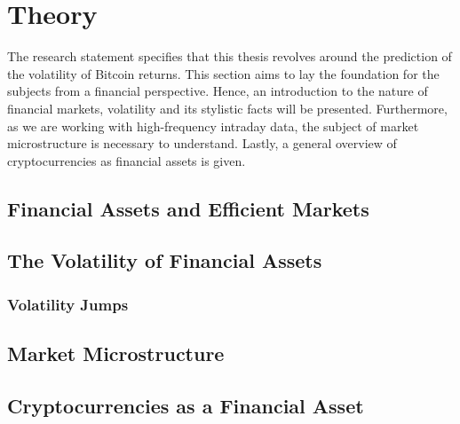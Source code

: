 \chapter{Theory}
\label{sec:orga7e1c8a}
The research statement specifies that this thesis revolves around the prediction of the volatility of Bitcoin returns.
This section aims to lay the foundation for the subjects from a financial perspective.
Hence, an introduction to the nature of financial markets, volatility and its stylistic facts will be presented.
Furthermore, as we are working with high-frequency intraday data, the subject of market microstructure is necessary to understand.
Lastly, a general overview of cryptocurrencies as financial assets is given.

\section{Financial Assets and Efficient Markets}
\label{sec:org1e911ea}


\section{The Volatility of Financial Assets}
\label{sec:org9e3d3c1}

\subsection{Volatility Jumps}
\label{sec:org349ks10}

\section{Market Microstructure}
\label{sec:org5e3d3c1}

\section{Cryptocurrencies as a Financial Asset}
\label{sec:org93ka01j}
